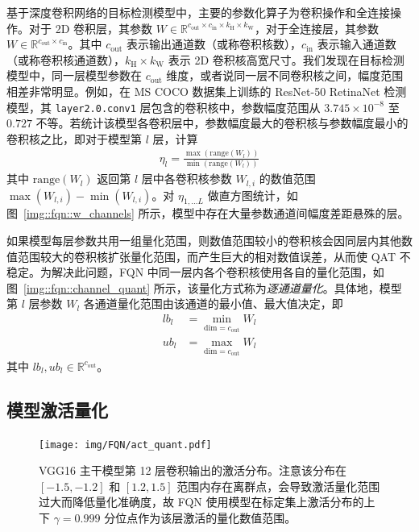 \documentclass[
  fontset = mac,
]{shtthesis}
\begin{document}
基于深度卷积网络的目标检测模型中，主要的参数化算子为卷积操作和全连接操作。对于 2D 卷积层，其参数 $W \in \mathbb{R}^{c_{\mathrm{out}} \times c_{\mathrm{in}} \times k_{\mathrm{H}} \times k_{\mathrm{W}}}$，对于全连接层，其参数 $W \in \mathbb{R}^{c_{\mathrm{out}} \times c_{\mathrm{in}}}$。其中 $c_{\mathrm{out}}$ 表示输出通道数（或称卷积核数），$c_{\mathrm{in}}$ 表示输入通道数（或称卷积核通道数），$k_{\mathrm{H}} \times k_{\mathrm{W}}$ 表示 2D 卷积核高宽尺寸。我们发现在目标检测模型中，同一层模型参数在 $c_{\mathrm{out}}$ 维度，或者说同一层不同卷积核之间，幅度范围相差非常明显。例如，在 MS COCO 数据集上训练的 ResNet-50 RetinaNet 检测模型，其 \verb|layer2.0.conv1| 层包含的卷积核中，参数幅度范围从 $3.745 \times 10^{−8}$ 至 $0.727$ 不等。若统计该模型各卷积层中，参数幅度最大的卷积核与参数幅度最小的卷积核之比，即对于模型第 $l$ 层，计算
\begin{align}
  \eta_l = \frac{\max(\mathrm{range} (W_l))}{\min(\mathrm{range}(W_l))} \label{eq::fqn::w_range_ratio}
\end{align}
其中 $\mathrm{range}(W_l)$ 返回第 $l$ 层中各卷积核参数 $W_{l, i}$ 的数值范围 $\max(W_{l, i}) - \min(W_{l, i})$。对 $\eta_{1, \ldots L}$ 做直方图统计，如图~\ref{img::fqn::w_channels} 所示，模型中存在大量参数通道间幅度差距悬殊的层。

如果模型每层参数共用一组量化范围，则数值范围较小的卷积核会因同层内其他数值范围较大的卷积核扩张量化范围，而产生巨大的相对数值误差，从而使 QAT 不稳定。为解决此问题，FQN 中同一层内各个卷积核使用各自的量化范围，如图~\ref{img::fqn::channel_quant} 所示，该量化方式称为\emph{逐通道量化}。具体地，模型第 $l$ 层参数 $W_l$ 各通道量化范围由该通道的最小值、最大值决定，即
\begin{align}
  lb_l &= \min_{\mathrm{dim}=c_{\mathrm{out}}} W_l \\
  ub_l &= \max_{\mathrm{dim}=c_{\mathrm{out}}} W_l
\end{align}
其中 $lb_l, ub_l \in \mathbb{R}^{c_{\mathrm{out}}}$。
\subsection{模型激活量化} \label{sec::fqn::q_act}

\begin{figure}[htb]
  \centering
  \texttt{[image: img/FQN/act\_quant.pdf]}
  \caption{VGG16 主干模型第 12 层卷积输出的激活分布。注意该分布在 $[-1.5, -1.2]$ 和 $[1.2, 1.5]$ 范围内存在离群点，会导致激活量化范围过大而降低量化准确度，故 FQN 使用模型在标定集上激活分布的上下 $\gamma = 0.999$ 分位点作为该层激活的量化数值范围。}
  \label{img::fqn::q_act}
\end{figure}
\end{document}
